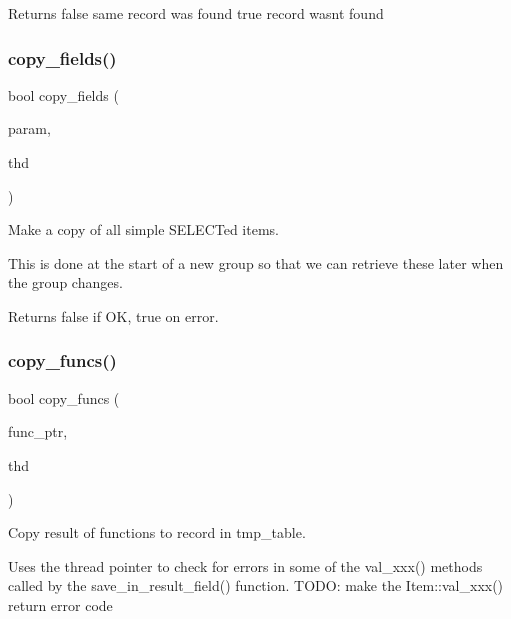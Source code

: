 \begin{DoxyReturn}{Returns}
false same record was found true record wasn\textquotesingle{}t found 
\end{DoxyReturn}
\mbox{\label{group__Query__Executor_ga6ae2b33e35bb51f5250fac64ee0d231b}} 
\subsubsection{\texorpdfstring{copy\+\_\+fields()}{copy\_fields()}}
{\footnotesize\ttfamily bool copy\+\_\+fields (\begin{DoxyParamCaption}\item[{Temp\+\_\+table\+\_\+param $\ast$}]{param,  }\item[{const T\+HD $\ast$}]{thd }\end{DoxyParamCaption})}

Make a copy of all simple S\+E\+L\+E\+CT\textquotesingle{}ed items.

This is done at the start of a new group so that we can retrieve these later when the group changes. \begin{DoxyReturn}{Returns}
false if OK, true on error. 
\end{DoxyReturn}
\mbox{\label{group__Query__Executor_ga7f64c00677c38e6f233e43f47a52aef7}} 
\subsubsection{\texorpdfstring{copy\+\_\+funcs()}{copy\_funcs()}}
{\footnotesize\ttfamily bool copy\+\_\+funcs (\begin{DoxyParamCaption}\item[{\mbox{\hyperlink{classMem__root__array}{Func\+\_\+ptr\+\_\+array}} $\ast$}]{func\+\_\+ptr,  }\item[{const T\+HD $\ast$}]{thd }\end{DoxyParamCaption})}

Copy result of functions to record in tmp\+\_\+table.

Uses the thread pointer to check for errors in some of the val\+\_\+xxx() methods called by the save\+\_\+in\+\_\+result\+\_\+field() function. T\+O\+DO\+: make the Item\+::val\+\_\+xxx() return error code


